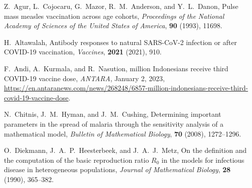 \documentclass[11pt,reqno]{amsart}
\begin{document}
\begin{thebibliography}{99}

     \newblock Z.\ Agur, L.\ Cojocaru, G.\ Mazor, R.\ M.\ Anderson, and Y.\ L.\ Danon,
     \newblock Pulse mass measles vaccination across age cohorts,
     \newblock \emph{Proceedings of the National Academy of Sciences of the United States of America}, \textbf{90} (1993), 11698.

     \newblock H.\ Altawalah,
     \newblock Antibody responses to natural SARS-CoV-2 infection or after COVID-19 vaccination,
     \newblock \emph{Vaccines}, \textbf{2021} (2021), 910.

     F.\ Andi, A.\ Kurmala, and R.\ Nasution,
      million Indonesians receive third COVID-19 vaccine dose,
     \newblock \emph{ANTARA}, January 2, 2023, \ul{https://en.antaranews.com/news/268248/6857-million-indonesians-receive-third-covid-19-vaccine-dose}.



     \newblock N.\ Chitnis, J.\ M.\ Hyman, and J.\ M.\ Cushing,
     \newblock Determining important parameters in the spread of malaria through the sensitivity analysis of a mathematical model,
     \newblock \emph{Bulletin of Mathematical Biology}, \textbf{70} (2008), 1272--1296.

     O.\ Diekmann, J.\ A.\ P.\ Heesterbeek, and J.\ A.\ J.\ Metz,
     \newblock On the definition and the computation of the basic reproduction ratio $R_0$ in the models for infectious disease in heterogeneous populations,
     \newblock \emph{Journal of Mathematical Biology}, \textbf{28} (1990), 365--382.


\end{thebibliography}
\end{document}
